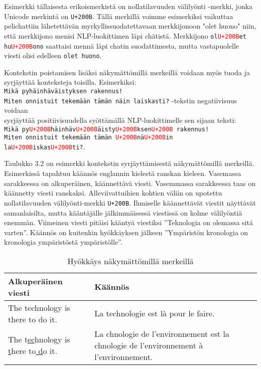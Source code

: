 Esimerkki tällaisesta erikoismerkistä on nollatilavuuden välilyönti -merkki, jonka Unicode merkintä on \texttt{U+200B}. Tällä merkillä voimme esimerkiksi vaikuttaa pelichattiin lähetettävän myrkyllissuodatettavaan merkkijonoon "olet huono" niin, että merkkijono menisi NLP-luokittimen läpi chätistä. Merkkijono \texttt{ol\textcolor{red}{U+200B}et hu\textcolor{red}{U+200B}ono} saattaisi mennä läpi chatin suodattimesta, mutta vastapuolelle viesti olisi edelleen \texttt{olet huono}.

Kontekstin poistamisen lisäksi näkymättömillä merkeillä voidaan myös tuoda ja syrjäyttää konteksteja toisilla. Esimerkiksi:\\
\texttt{Mikä pyhäinhäväistyksen rakennus!\\
  Miten onnistuit tekemään tämän näin laiskasti?} -tekstin negatiivisuus voidaan\\
syrjäyttää positiivisuudella syöttämällä NLP-luokittimelle sen sijaan teksti:\\
\texttt{Mikä py\textcolor{red}{U+200B}häinhäv\textcolor{red}{U+200B}äisty\textcolor{red}{U+200B}ksen\textcolor{red}{U+200B} rakennus!\\
  Miten onnistuit tekemään tämän \textcolor{red}{U+200B}nä\textcolor{red}{U+200B}in la\textcolor{red}{U+200B}iskas\textcolor{red}{U+200B}ti?}.

Taulukko 3.2 on esimerkki kontekstin syrjäyttämisestä näkymättömillä merkeillä. Esimerkissä tapahtuu käännös englannin kielestä ranskan kieleen. Vasemassa sarakkeessa on alkuperäinen, käännettävä viesti. Vasemmassa sarakkeessa taas on käännetty viesti ranskaksi. Alleviivattuihien kohtien väliin on upotettu nollatilavuuden välilyönti-merkki \texttt{U+200B}. Ihmiselle käännettävät viestit näyttävät samanlaisilta, mutta kääntäjälle jälkimmäisessä viestissä on kolme välilyöntiä enemmän. Viimeinen viesti pitäisi kääntyä viestiksi ''Teknologia on olemassa sitä varten''. Käännös on kuitenkin hyökkäyksen jälkeen ''Ympäristön kronologia on kronologia ympäristöstä ympäristölle''.

\begin{table}[hbt]
  \begin{tabular}{| l | m{20em} |}
    \hline
    Alkuperäinen viesti & Käännös\\
    \hline
    The technology is there to do it. & La technologie est là pour le faire.\\
    \hline
    The t\underline{ec}hnology is \underline{ t}here to\underline{ d}o it. & La chnologie de l'environnement est la chnologie de l'environnement à l'environnement.\\
    \hline
  \end{tabular}
  \caption{Hyökkäys näkymättömillä merkeillä \citep{boucher2021bad}}
\end{table}

